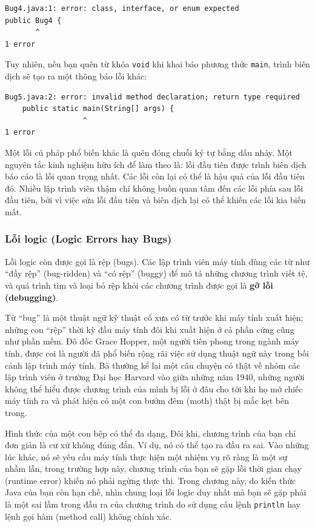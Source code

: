 \begin{verbatim}
Bug4.java:1: error: class, interface, or enum expected
public Bug4 {
       ^
1 error
\end{verbatim}

Tuy nhiên, nếu bạn quên từ khóa \texttt{void} khi khai báo phương thức
\texttt{main}, trình biên dịch sẽ tạo ra một thông báo lỗi khác:

\begin{verbatim}
Bug5.java:2: error: invalid method declaration; return type required
    public static main(String[] args) {
                  ^
1 error
\end{verbatim}

Một lỗi cú pháp phổ biến khác là quên đóng chuỗi ký tự bằng dấu nháy.
Một nguyên tắc kinh nghiệm hữu ích để làm theo là: lỗi đầu tiên được
trình biên dịch báo cáo là lỗi quan trọng nhất. Các lỗi còn lại có thể
là hậu quả của lỗi đầu tiên đó. Nhiều lập trình viên thậm chí không buồn
quan tâm đến các lỗi phía sau lỗi đầu tiên, bởi vì việc sửa lỗi đầu tiên
và biên dịch lại có thể khiến các lỗi kia biến mất.

\subsubsection{Lỗi logic (Logic Errors hay
Bugs)}\label{lux1ed7i-logic-logic-errors-hay-bugs}

Lỗi logic còn được gọi là rệp (bugs). Các lập trình viên máy tính dùng
các từ như ``đầy rệp'' (bug-ridden) và ``có rệp'' (buggy) để mô tả những
chương trình viết tệ, và quá trình tìm và loại bỏ rệp khỏi các chương
trình được gọi là \textbf{gỡ lỗi (debugging)}.

Từ ``bug'' là một thuật ngữ kỹ thuật cổ xưa có từ trước khi máy tính
xuất hiện; những con ``rệp'' thời kỳ đầu máy tính đôi khi xuất hiện ở cả
phần cứng cũng như phần mềm. Đô đốc Grace Hopper, một người tiên phong
trong ngành máy tính, được coi là người đã phổ biến rộng rãi việc sử
dụng thuật ngữ này trong bối cảnh lập trình máy tính. Bà thường kể lại
một câu chuyện có thật về nhóm các lập trình viên ở trường Đại học
Harvard vào giữa những năm 1940, những người không thể hiểu được chương
trình của mình bị lỗi ở đâu cho tới khi họ mở chiếc máy tính ra và phát
hiện có một con bướm đêm (moth) thật bị mắc kẹt bên trong.

Hình thức của một con bệp có thể đa dạng. Đôi khi, chương trình của bạn
chỉ đơn giản là cư xử không đúng đắn. Ví dụ, nó có thể tạo ra đầu ra
sai. Vào những lúc khác, nó sẽ yêu cầu máy tính thực hiện một nhiệm vụ
rõ ràng là một sự nhầm lẫn, trong trường hợp này, chương trình của bạn
sẽ gặp lỗi thời gian chạy (runtime error) khiến nó phải ngừng thực thi.
Trong chương này, do kiến thức Java của bạn còn hạn chế, nhìn chung loại
lỗi logic duy nhất mà bạn sẽ gặp phải là một sai lầm trong đầu ra của
chương trình do sử dụng câu lệnh \texttt{println} hay lệnh gọi hàm
(method call) không chính xác.

